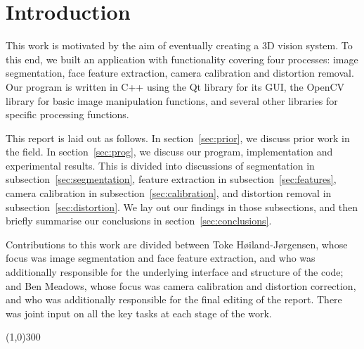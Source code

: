 
\section{Introduction}

This work is motivated by the aim of eventually creating a 3D vision system. To this end, we built an application with functionality covering four processes: image segmentation, face feature extraction, camera calibration and distortion removal. Our program is written in C++ using the Qt library for its GUI, the OpenCV library for basic image manipulation functions, and several other libraries for specific processing functions.

This report is laid out as follows. In section~\ref{sec:prior}, we discuss prior work in the field. In section~\ref{sec:prog}, we discuss our program, implementation and experimental results. This is divided into discussions of segmentation in subsection~\ref{sec:segmentation}, feature extraction in subsection~\ref{sec:features}, camera calibration in subsection~\ref{sec:calibration}, and distortion removal in subsection~\ref{sec:distortion}. We lay out our findings in those subsections, and then briefly summarise our conclusions in section~\ref{sec:conclusions}.

Contributions to this work are divided between Toke Høiland-Jørgensen, whose focus was image segmentation and face feature extraction, and who was additionally responsible for the underlying interface and structure of the code; and Ben Meadows, whose focus was camera calibration and distortion correction, and who was additionally responsible for the final editing of the report. There was joint input on all the key tasks at each stage of the work.

\begin{center}
\line(1,0){300}
\end{center}
